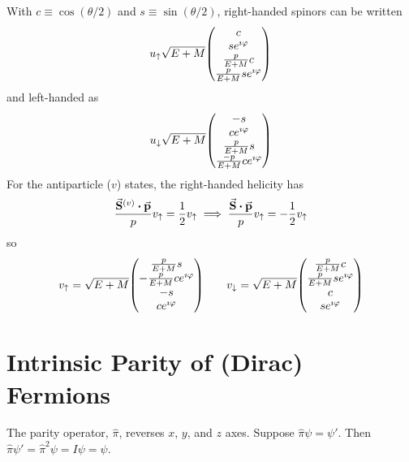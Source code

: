 \documentclass[a4paper,twoside,master.tex]{subfiles}
\begin{document}

With $ c \equiv \cos(\theta / 2) $ and $ s \equiv \sin(\theta / 2) $, right-handed spinors can be written
\begin{equation}
    u_{\uparrow} \sqrt{E + M} \mqty(c\\se^{\imath \varphi} \\ \frac{p}{E+M} c\\ \frac{p}{E+M} se^{\imath \varphi})
\end{equation}
and left-handed as
\begin{equation}
    u_{\downarrow} \sqrt{E+M} \mqty(-s\\ c e^{\imath \varphi} \\ \frac{p}{E+M} s \\ \frac{-p}{E+M} c e^{\imath \varphi})
\end{equation}
For the antiparticle ($ v $) states, the right-handed helicity has
\begin{equation}
    \frac{\va{S}^{(v)} \vdot \va{p}}{p} v_{\uparrow} = \frac{1}{2} v_{\uparrow} \implies \frac{\va{S} \vdot \va{p}}{p} v_{\uparrow} = - \frac{1}{2} v_{\uparrow}
\end{equation}
so
\begin{equation}
    v_{\uparrow} = \sqrt{E+M} \mqty(\frac{p}{E+M} s \\- \frac{p}{E+M} c e^{\imath \varphi} \\ -s\\ c e^{\imath \varphi}) \qquad v_{\downarrow} = \sqrt{E+M} \mqty(\frac{p}{E+M} c \\ \frac{p}{E+M} s e^{\imath \varphi} \\ c \\ s e^{\imath \varphi})
\end{equation}

\section{Intrinsic Parity of (Dirac) Fermions}\label{sec:intrinsic_parity_of_(dirac)_fermions}

The parity operator, $ \hat{\pi} $, reverses $ x $, $ y $, and $ z $ axes. Suppose $ \hat{\pi} \psi = \psi' $. Then $ \hat{\pi} \psi' = \hat{\pi}^2 \psi = I \psi = \psi $.
\end{document}
